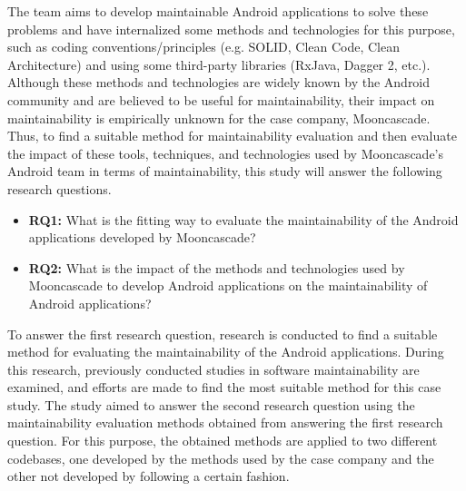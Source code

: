 The team aims to develop maintainable Android applications to solve these problems and have internalized some methods and technologies for this purpose, such as coding conventions/principles (e.g. SOLID, Clean Code, Clean Architecture) and using some third-party libraries (RxJava, Dagger 2, etc.). Although these methods and technologies are widely known by the Android community and are believed to be useful for maintainability, their impact on maintainability is empirically unknown for the case company, Mooncascade. Thus, to find a suitable method for maintainability evaluation and then evaluate the impact of these tools, techniques, and technologies used by Mooncascade’s Android team in terms of maintainability, this study will answer the following research questions. 

\begin{itemize}
\item \noindent\textbf{RQ1:} What is the fitting way to evaluate the maintainability of the Android applications developed by Mooncascade?
\item \noindent\textbf{RQ2:} What is the impact of the methods and technologies used by Mooncascade to develop Android applications on the maintainability of Android applications?
\end{itemize}

To answer the first research question, research is conducted to find a suitable method for evaluating the maintainability of the Android applications. During this research, previously conducted studies in software maintainability are examined, and efforts are made to find the most suitable method for this case study. The study aimed to answer the second research question using the maintainability evaluation methods obtained from answering the first research question. For this purpose, the obtained methods are applied to two different codebases, one developed by the methods used by the case company and the other not developed by following a certain fashion.